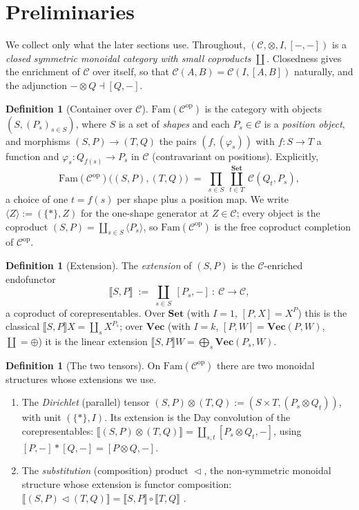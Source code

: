 \documentclass[11pt]{amsart}
\theoremstyle{plain}
\theoremstyle{definition}
\newtheorem{definition}[theorem]{Definition}
\theoremstyle{remark}
\newcommand{\C}{\mathcal{C}}
\newcommand{\Set}{\mathbf{Set}}
\newcommand{\Vect}{\mathbf{Vec}}
\newcommand{\Fam}{\mathrm{Fam}}
\newcommand{\ext}[1]{\llbracket #1 \rrbracket}
\newcommand{\ihom}[2]{[#1,#2]}
\renewcommand{\lhd}{\vartriangleleft}
\newcommand{\op}{\mathrm{op}}
\newcommand{\coprodd}{\textstyle\coprod}
\newcommand{\prodd}{\textstyle\prod}
\begin{document}
\section{Preliminaries}\label{sec:prelim}

We collect only what the later sections use. Throughout, $(\C,\otimes,I,\ihom{-}{-})$ is a
\emph{closed symmetric monoidal category with small coproducts} $\coprod$. Closedness gives the
enrichment of $\C$ over itself, so that $\C(A,B)=\C(I,\ihom{A}{B})$ naturally, and the adjunction
$-\otimes Q\dashv \ihom{Q}{-}$.

\begin{definition}[Container over $\C$]\label{def:cont}
$\Fam(\C^\op)$ is the category with objects $(S,(P_s)_{s\in S})$, where $S$ is a set of
\emph{shapes} and each $P_s\in\C$ is a \emph{position object}, and morphisms
$(S,P)\to(T,Q)$ the pairs $(f,(\varphi_s))$ with $f\colon S\to T$ a function and
$\varphi_s\colon Q_{f(s)}\to P_s$ in $\C$ (contravariant on positions). Explicitly,
\[
\Fam(\C^\op)\bigl((S,P),(T,Q)\bigr) \;=\; \prodd_{s\in S}\ \coprodd^{\Set}_{t\in T}\ \C(Q_t,P_s),
\]
a choice of one $t=f(s)$ per shape plus a position map. We write $\langle Z\rangle:=(\{*\},Z)$ for
the one-shape generator at $Z\in\C$; every object is the coproduct
$(S,P)=\coprodd_{s\in S}\langle P_s\rangle$, so $\Fam(\C^\op)$ is the free coproduct completion of
$\C^\op$.
\end{definition}

\begin{definition}[Extension]\label{def:ext}
The \emph{extension} of $(S,P)$ is the $\C$-enriched endofunctor
\[
\ext{S,P} \;:=\; \coprodd_{s\in S}\ \ihom{P_s}{-}\ \colon\ \C\longrightarrow\C,
\]
a coproduct of corepresentables. Over $\Set$ (with $I=1$, $\ihom{P}{X}=X^P$) this is the classical
$\ext{S,P}X=\coprodd_s X^{P_s}$; over $\Vect$ (with $I=k$, $\ihom{P}{W}=\Vect(P,W)$, $\coprod=\oplus$)
it is the linear extension $\ext{S,P}W=\bigoplus_s\Vect(P_s,W)$.
\end{definition}

\begin{definition}[The two tensors]\label{def:tensors}
On $\Fam(\C^\op)$ there are two monoidal structures whose extensions we use.
\begin{enumerate}
\item The \emph{Dirichlet} (parallel) tensor $(S,P)\otimes(T,Q):=(S\times T,(P_s\otimes Q_t))$, with
unit $(\{*\},I)$. Its extension is the Day convolution \cite{Day} of the corepresentables:
$\ext{(S,P)\otimes(T,Q)}=\coprodd_{s,t}\ihom{P_s\otimes Q_t}{-}$, using
$\ihom{P}{-}\ast\ihom{Q}{-}=\ihom{P\otimes Q}{-}$.
\item The \emph{substitution} (composition) product $\lhd$, the non-symmetric monoidal structure
whose extension is functor composition: $\ext{(S,P)\lhd(T,Q)}=\ext{S,P}\circ\ext{T,Q}$
\cite{DJN,NiuSpivak}.
\end{enumerate}
\end{definition}
\end{document}
